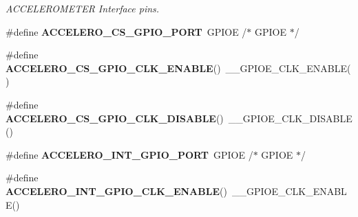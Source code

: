 \begin{DoxyCompactItemize}
\begin{DoxyCompactList}\small\item\em A\+C\+C\+E\+L\+E\+R\+O\+M\+E\+T\+ER Interface pins. \end{DoxyCompactList}\item 
\mbox{\label{group___s_t_m32_f4___d_i_s_c_o_v_e_r_y___l_o_w___l_e_v_e_l___b_u_s_ga7ae240cbd922beeeec3eea45c593a2d6}} 
\#define {\bfseries A\+C\+C\+E\+L\+E\+R\+O\+\_\+\+C\+S\+\_\+\+G\+P\+I\+O\+\_\+\+P\+O\+RT}~G\+P\+I\+OE                      /$\ast$ G\+P\+I\+OE $\ast$/
\item 
\mbox{\label{group___s_t_m32_f4___d_i_s_c_o_v_e_r_y___l_o_w___l_e_v_e_l___b_u_s_ga8c9e5d63b6d395f18e83246fe741bc56}} 
\#define {\bfseries A\+C\+C\+E\+L\+E\+R\+O\+\_\+\+C\+S\+\_\+\+G\+P\+I\+O\+\_\+\+C\+L\+K\+\_\+\+E\+N\+A\+B\+LE}()~\+\_\+\+\_\+\+G\+P\+I\+O\+E\+\_\+\+C\+L\+K\+\_\+\+E\+N\+A\+B\+LE()
\item 
\mbox{\label{group___s_t_m32_f4___d_i_s_c_o_v_e_r_y___l_o_w___l_e_v_e_l___b_u_s_gae9bf5c06cbb55dcae05a8cb132de1f7c}} 
\#define {\bfseries A\+C\+C\+E\+L\+E\+R\+O\+\_\+\+C\+S\+\_\+\+G\+P\+I\+O\+\_\+\+C\+L\+K\+\_\+\+D\+I\+S\+A\+B\+LE}()~\+\_\+\+\_\+\+G\+P\+I\+O\+E\+\_\+\+C\+L\+K\+\_\+\+D\+I\+S\+A\+B\+LE()
\item 
\mbox{\label{group___s_t_m32_f4___d_i_s_c_o_v_e_r_y___l_o_w___l_e_v_e_l___b_u_s_gaee4ecf3378c7d0905dcb0003a2664ef1}} 
\#define {\bfseries A\+C\+C\+E\+L\+E\+R\+O\+\_\+\+I\+N\+T\+\_\+\+G\+P\+I\+O\+\_\+\+P\+O\+RT}~G\+P\+I\+OE                      /$\ast$ G\+P\+I\+OE $\ast$/
\item 
\mbox{\label{group___s_t_m32_f4___d_i_s_c_o_v_e_r_y___l_o_w___l_e_v_e_l___b_u_s_gaffd04b1e96fd9c3e0944115c26208e3d}} 
\#define {\bfseries A\+C\+C\+E\+L\+E\+R\+O\+\_\+\+I\+N\+T\+\_\+\+G\+P\+I\+O\+\_\+\+C\+L\+K\+\_\+\+E\+N\+A\+B\+LE}()~\+\_\+\+\_\+\+G\+P\+I\+O\+E\+\_\+\+C\+L\+K\+\_\+\+E\+N\+A\+B\+LE()
\item 
\mbox{\label{group___s_t_m32_f4___d_i_s_c_o_v_e_r_y___l_o_w___l_e_v_e_l___b_u_s_ga24c4c4edd39c2a1382ec67f3eadbe169}} 

\end{DoxyCompactItemize}
